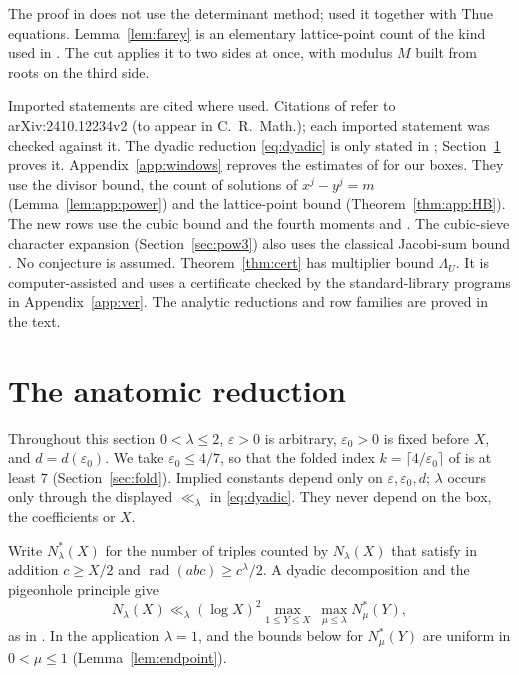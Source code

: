 \documentclass{amsart}
\theoremstyle{definition}
\theoremstyle{plain}
\numberwithin{equation}{section}
\numberwithin{table}{section}
\newcommand{\rad}{\operatorname{rad}}
\begin{document}
The proof in \cite{BBLT} does not use the determinant method; \cite{BLT} used
it together with Thue equations. Lemma~\ref{lem:farey} is an elementary
lattice-point count of the kind used in \cite[Proposition~4.1]{BBLT}. The cut
applies it to two sides at once, with modulus $M$ built from roots on the third
side.

Imported statements are cited where used. Citations of \cite{BBLT} refer to
arXiv:\allowbreak2410.12234v2 (to appear in C.~R.~Math.); each imported
statement was checked against it. The dyadic reduction \eqref{eq:dyadic} is
only stated in \cite[Section~2]{BBLT}; Section~\ref{sec:red} proves it.
Appendix~\ref{app:windows} reproves the estimates of
\cite[Propositions~2.3, 3.1 and~4.1]{BBLT} for our boxes. They use the
divisor bound, the count of solutions of $x^j-y^j=m$
(Lemma~\ref{lem:app:power}) and the lattice-point bound \cite[Lemma~3]{HB}
(Theorem~\ref{thm:app:HB}). The new rows use
the cubic bound \cite[Theorem~1.3]{HBcube} and the fourth moments
\cite[Lemma~4]{GMRR} and \cite[Theorem~1]{CS}. The cubic-sieve character expansion
(Section~\ref{sec:pow3}) also uses the classical Jacobi-sum bound \cite{IR}.
No conjecture is assumed. Theorem~\ref{thm:cert}
has multiplier bound $\Lambda_U$. It is computer-assisted
and uses a certificate checked by the standard-library programs in
Appendix~\ref{app:ver}. The analytic reductions and row families are proved in
the text.


\section{The anatomic reduction}\label{sec:red}

Throughout this section $0<\lambda\le2$, $\varepsilon>0$ is arbitrary,
$\varepsilon_0>0$ is fixed before $X$, and $d=d(\varepsilon_0)$. We take
$\varepsilon_0\le4/7$, so that the folded index $k=\lceil4/\varepsilon_0\rceil$
of \cite[Lemma~2.2]{BBLT} is at least $7$ (Section~\ref{sec:fold}).
Implied constants depend only on $\varepsilon,\varepsilon_0,d$; $\lambda$ occurs
only through the displayed $\ll_\lambda$ in \eqref{eq:dyadic}. They never depend on the box,
the coefficients or $X$.

Write $N^*_\lambda(X)$ for the number of triples counted by $N_\lambda(X)$ that
satisfy in addition $c\ge X/2$ and $\rad(abc)\ge c^{\lambda}/2$. A dyadic
decomposition and the pigeonhole principle give
\begin{equation}\label{eq:dyadic}
 N_\lambda(X)\ll_\lambda(\log X)^2\max_{1\le Y\le X}\ \max_{\mu\le\lambda}N^*_\mu(Y),
\end{equation}
as in \cite[Section~2]{BBLT}. In the application $\lambda=1$, and the bounds
below for $N^*_\mu(Y)$ are uniform in $0<\mu\le1$
(Lemma~\ref{lem:endpoint}).
\end{document}
